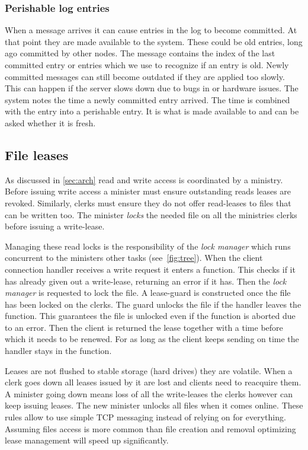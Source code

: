 \subsubsection*{Perishable log entries}
When a \raft{} message arrives it can cause entries in the log to become committed. At that point they are made available to the system. These could be old entries, long ago committed by other nodes. The message contains the index of the last committed entry or entries which we use to recognize if an entry is old. Newly committed messages can still become outdated if they are applied too slowly. This can happen if the server slows down due to bugs in \name{} or hardware issues. The system notes the time a newly committed entry arrived. The time is combined with the entry into a perishable entry. It is what is made available to \name{} and can be asked whether it is fresh.

\subsection{File leases} \label{sec:impl_leases}
As discussed in \cref{sec:arch} read and write access is coordinated by a ministry. Before issuing write access a minister must ensure outstanding reads leases are revoked. Similarly, clerks must ensure they do not offer read-leases to files that can be written too. The minister \emph{locks} the needed file on all the ministries clerks before issuing a write-lease. 

Managing these read locks is the responsibility of the \textit{lock manager} which runs concurrent to the ministers other tasks (see~\cref{fig:tree}). When the client connection handler \straightTasksLeg{} receives a write request it enters a  function. This checks if it has already given out a write-lease, returning an error if it has. Then the \textit{lock manager} is requested to lock the file. A lease-guard is constructed once the file has been locked on the clerks. The guard unlocks the file if the handler leaves the  function. This guarantees the file is unlocked even if the function is aborted due to an error. Then the client is returned the lease together with a time before which it needs to be renewed. For as long as the client keeps sending  on time the handler stays in the  function.

Leases are not flushed to stable storage (hard drives) they are volatile. When a clerk goes down all leases issued by it are lost and clients need to reacquire them. A minister going down means loss of all the write-leases the clerks however can keep issuing leases. The new minister unlocks all files when it comes online. These rules allow \name{} to use simple TCP messaging instead of relying on \raft{} for everything. Assuming files access is more common than file creation and removal optimizing lease management will speed up \name{} significantly.
%
